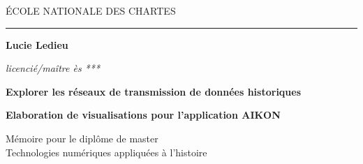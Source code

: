 \begin{titlepage}
	\begin{center}
		
		\bigskip
		
		\begin{large}
			ÉCOLE NATIONALE DES CHARTES
		\end{large}
		\begin{center}\rule{2cm}{0.02cm}\end{center}
		
		\bigskip
		\bigskip
		\bigskip
		\begin{Large}
			\textbf{Lucie Ledieu}\\
		\end{Large}
		\begin{normalsize} \textit{licencié/maître ès ***}\\
		\end{normalsize}
		
		\bigskip
		\bigskip
		\bigskip
		
		\begin{Huge}
			\textbf{Explorer les réseaux de transmission de données historiques}\\
		\end{Huge}
		\bigskip
		\bigskip
		\begin{LARGE}
			\textbf{Elaboration de visualisations pour l'application AIKON}\\
		\end{LARGE}
		
		\bigskip
		\bigskip
		\bigskip
		\begin{large}
		\end{large}
		\vfill
		
		\begin{large}
			Mémoire 
			pour le diplôme de master \\
			\og Technologies numériques appliquées à l'histoire~\fg\\
		\end{large}
		
	\end{center}
\end{titlepage}